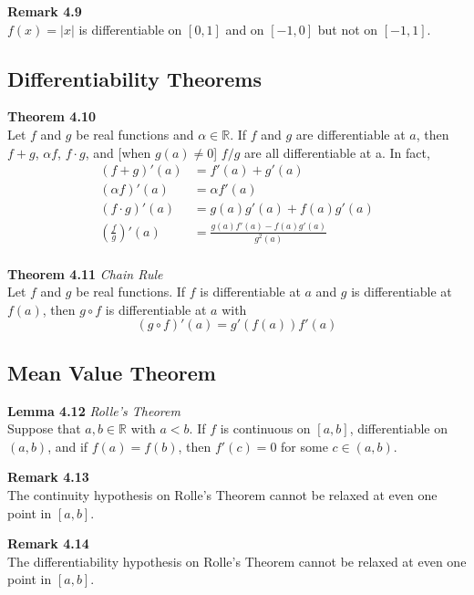 \documentclass[8pt,landscape]{article}
\begin{document}
\begin{multicols}{3}
    \textbf{Remark 4.9} \\
    $f(x) = |x|$ is differentiable on $[0, 1]$ and on $[-1, 0]$ but not on $[-1, 1]$.

    \subsection{Differentiability Theorems}

    \textbf{Theorem 4.10} \\
    Let $f$ and $g$ be real functions and $\alpha \in \mathbb{R}$.
    If $f$ and $g$ are differentiable at $a$, then $f+g$, $\alpha f$, $f \cdot g$,
    and [when $g(a) \neq 0$] $f/g$ are all differentiable at a.
    In fact,
    \begin{align*}{}
        (f+g)'(a) &= f'(a) + g'(a) \\
        (\alpha f)'(a) &= \alpha f'(a) \\
        (f \cdot g)'(a) &= g(a) g'(a) + f(a) g'(a) \\
        \left( \frac{f}{g}\right)'(a) &= \frac{g(a) f'(a) - f(a) g'(a)}{g^2(a)} \\
    \end{align*}

    \textbf{Theorem 4.11} \emph{Chain Rule} \\
    Let $f$ and $g$ be real functions.
    If $f$ is differentiable at $a$ and $g$ is differentiable at $f(a)$, then
    $g \circ f$ is differentiable at $a$ with
    \[
        (g \circ f)'(a) = g'(f(a))f'(a)
    \]

    \subsection{Mean Value Theorem}

    \textbf{Lemma 4.12} \emph{Rolle's Theorem} \\
    Suppose that $a, b \in \mathbb{R}$ with $a < b$.
    If $f$ is continuous on $[a, b]$, differentiable on $(a, b)$, and if $f(a) = f(b)$,
    then $f'(c) = 0$ for some $c \in (a, b)$.

    \textbf{Remark 4.13} \\
    The continuity hypothesis on Rolle's Theorem cannot be relaxed at even one point
    in $[a, b]$.

    \textbf{Remark 4.14} \\
    The differentiability hypothesis on Rolle's Theorem cannot be relaxed at even one point
    in $[a, b]$.


\end{multicols}
\end{document}
